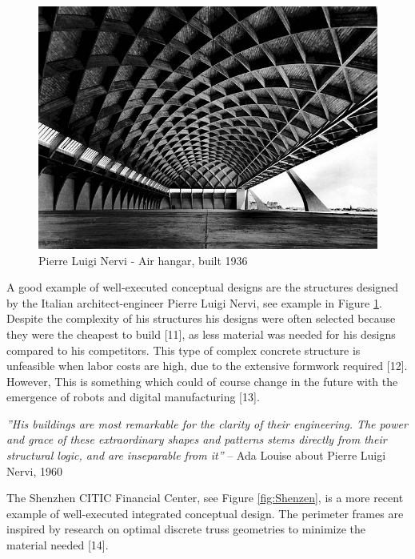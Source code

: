 \begin{figure}
  \includegraphics[width=350pt]{graphics/nervi.jpg}
  \caption{Pierre Luigi Nervi - Air hangar, built 1936}
  \label{fig:nervi}
\end{figure}

A good example of well-executed conceptual designs are the structures designed by the Italian architect-engineer Pierre Luigi Nervi, see example in Figure \ref{fig:nervi}. Despite the complexity of his structures his designs were often selected because they were the cheapest to build [11], as less material was needed for his designs compared to his competitors. This type of complex concrete structure is unfeasible when labor costs are high, due to the extensive formwork required [12]. However, This is something which could of course change in the future with the emergence of robots and digital manufacturing [13].

\textit{''His buildings are most remarkable for the clarity of their engineering. The power and grace of these extraordinary shapes and patterns stems directly from their structural logic, and are inseparable from it''} – Ada Louise about Pierre Luigi Nervi, 1960 \cite{Mueller2014}

The Shenzhen CITIC Financial Center, see Figure \ref{fig:Shenzen}, is a more recent example of well-executed integrated conceptual design. The perimeter frames are inspired by research on optimal discrete truss geometries to minimize the material needed [14].

